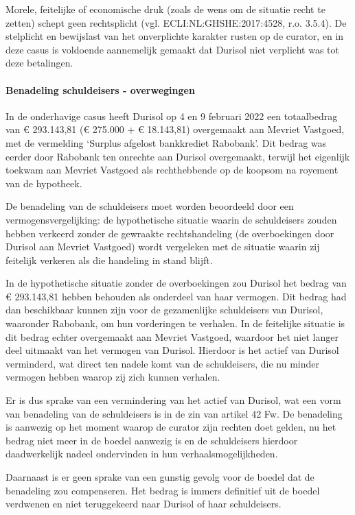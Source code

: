 \documentclass[
  dutch,
  a4paper,
]{article}
\begin{document}
Morele, feitelijke of economische druk (zoals de wens om de situatie recht te zetten) schept geen rechtsplicht (vgl. ECLI:NL:GHSHE:2017:4528, r.o. 3.5.4). De stelplicht en bewijslast van het onverplichte karakter rusten op de curator, en in deze casus is voldoende aannemelijk gemaakt dat Durisol niet verplicht was tot deze betalingen.

\paragraph{Benadeling schuldeisers - overwegingen}\label{benadeling-schuldeisers---overwegingen-15}

In de onderhavige casus heeft Durisol op 4 en 9 februari 2022 een totaalbedrag van € 293.143,81 (€ 275.000 + € 18.143,81) overgemaakt aan Mevriet Vastgoed, met de vermelding `Surplus afgelost bankkrediet Rabobank'. Dit bedrag was eerder door Rabobank ten onrechte aan Durisol overgemaakt, terwijl het eigenlijk toekwam aan Mevriet Vastgoed als rechthebbende op de koopsom na royement van de hypotheek.

De benadeling van de schuldeisers moet worden beoordeeld door een vermogensvergelijking: de hypothetische situatie waarin de schuldeisers zouden hebben verkeerd zonder de gewraakte rechtshandeling (de overboekingen door Durisol aan Mevriet Vastgoed) wordt vergeleken met de situatie waarin zij feitelijk verkeren als die handeling in stand blijft.

In de hypothetische situatie zonder de overboekingen zou Durisol het bedrag van € 293.143,81 hebben behouden als onderdeel van haar vermogen. Dit bedrag had dan beschikbaar kunnen zijn voor de gezamenlijke schuldeisers van Durisol, waaronder Rabobank, om hun vorderingen te verhalen. In de feitelijke situatie is dit bedrag echter overgemaakt aan Mevriet Vastgoed, waardoor het niet langer deel uitmaakt van het vermogen van Durisol. Hierdoor is het actief van Durisol verminderd, wat direct ten nadele komt van de schuldeisers, die nu minder vermogen hebben waarop zij zich kunnen verhalen.

Er is dus sprake van een vermindering van het actief van Durisol, wat een vorm van benadeling van de schuldeisers is in de zin van artikel 42 Fw. De benadeling is aanwezig op het moment waarop de curator zijn rechten doet gelden, nu het bedrag niet meer in de boedel aanwezig is en de schuldeisers hierdoor daadwerkelijk nadeel ondervinden in hun verhaalsmogelijkheden.

Daarnaast is er geen sprake van een gunstig gevolg voor de boedel dat de benadeling zou compenseren. Het bedrag is immers definitief uit de boedel verdwenen en niet teruggekeerd naar Durisol of haar schuldeisers.
\end{document}
